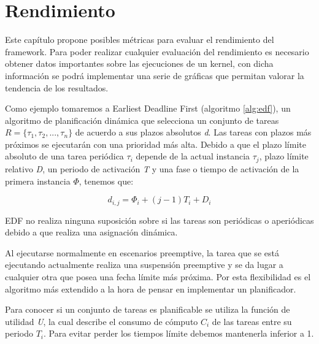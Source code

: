 \chapter{Rendimiento}
    \label{cha:Rendimiento}

Este capítulo propone posibles métricas para evaluar el rendimiento del framework. Para poder realizar cualquier evaluación del rendimiento es necesario obtener datos importantes sobre las ejecuciones de un kernel, con dicha información se podrá implementar una serie de gráficas que permitan valorar la tendencia de los resultados.
\newline

Como ejemplo tomaremos a Earliest Deadline First (algoritmo \ref{alg:edf}), un algoritmo de planificación dinámica que selecciona un conjunto de tareas \textit{$R=\{\tau_1,\tau_2,...,\tau_n\}$} de acuerdo a sus plazos absolutos \textit{d}. Las tareas con plazos más próximos se ejecutarán con una prioridad más alta\cite{Buta2011}. 
Debido a que el plazo límite absoluto de una tarea periódica \textit{$\tau_i$} depende de la actual instancia \textit{$\tau_j$}, plazo límite relativo \textit{D}, un periodo de activación \textit{T} y una fase o tiempo de activación de la primera instancia \textit{$\Phi$}, tenemos que:

\begin{equation}
d_{i,j} = \Phi_i + (j-1)T_i + D_i
\end{equation}

EDF no realiza ninguna suposición sobre si las tareas son periódicas o aperiódicas debido a que realiza una asignación dinámica. 



Al ejecutarse normalmente en escenarios preemptive, la tarea que se está ejecutando actualmente realiza una suspensión preemptive y se da lugar a cualquier otra que posea una fecha límite más próxima. Por esta flexibilidad es el algoritmo más extendido a la hora de pensar en implementar un planificador.
\newline

Para conocer si un conjunto de tareas es planificable se utiliza la función de utilidad \textit{U}, la cual describe el consumo de cómputo \textit{$C_i$} de las tareas entre su periodo \textit{$T_i$}. Para evitar perder los tiempos límite debemos mantenerla inferior a 1.

